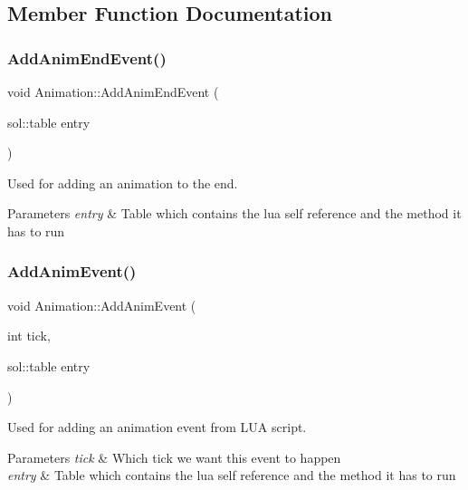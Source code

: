 \subsection{Member Function Documentation}
\mbox{\label{structAnimation_a724a8cd4b9958010758cd76a88a7853d}} 
\subsubsection{\texorpdfstring{Add\+Anim\+End\+Event()}{AddAnimEndEvent()}}
{\footnotesize\ttfamily void Animation\+::\+Add\+Anim\+End\+Event (\begin{DoxyParamCaption}\item[{sol\+::table}]{entry }\end{DoxyParamCaption})\hspace{0.3cm}{\ttfamily [inline]}}



Used for adding an animation to the end. 


\begin{DoxyParams}{Parameters}
{\em entry} & Table which contains the lua self reference and the method it has to run \\
\hline
\end{DoxyParams}
\mbox{\label{structAnimation_a0b4ff938810fc4f137b004b2a04d3c1d}} 
\subsubsection{\texorpdfstring{Add\+Anim\+Event()}{AddAnimEvent()}}
{\footnotesize\ttfamily void Animation\+::\+Add\+Anim\+Event (\begin{DoxyParamCaption}\item[{int}]{tick,  }\item[{sol\+::table}]{entry }\end{DoxyParamCaption})\hspace{0.3cm}{\ttfamily [inline]}}



Used for adding an animation event from L\+UA script. 


\begin{DoxyParams}{Parameters}
{\em tick} & Which tick we want this event to happen \\
\hline
{\em entry} & Table which contains the lua self reference and the method it has to run \\
\hline
\end{DoxyParams}
\mbox{\label{structAnimation_a8178c273c3890085c4a39da1fb1531fb}} 
